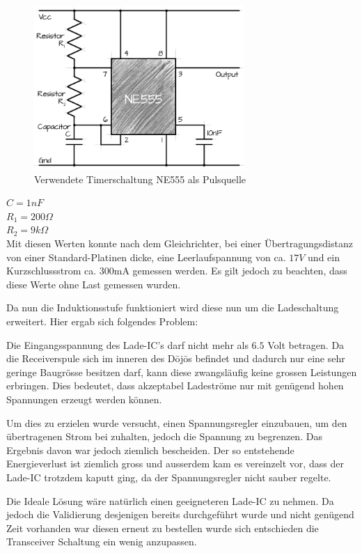 \begin{figure}[H]
	\begin{center}
		\includegraphics[width=80mm]{data/Ne555circuit.png}
		\caption[Verwendete Timerschaltung NE555 als Pulsquelle]{Verwendete Timerschaltung NE555 als Pulsquelle} %
		\label{fig:NE555}
	\end{center}
\end{figure}

$C = 1nF$\\
$R_{1} = 200\Omega$\\
$R_{2} = 9 k\Omega$\\

Mit diesen Werten konnte nach dem Gleichrichter, bei einer Übertragungsdistanz von einer Standard-Platinen dicke, eine Leerlaufspannung von ca. $17V$ und ein Kurzschlussstrom ca. 300mA gemessen werden. Es gilt jedoch zu beachten, dass diese Werte ohne Last gemessen wurden. 

Da nun die Induktionsstufe funktioniert wird diese nun um die Ladeschaltung erweitert. Hier ergab sich folgendes Problem:

Die Eingangsspannung des Lade-IC’s darf nicht mehr als $6.5$ Volt betragen. Da die Receiverspule sich im inneren des Dōjōs befindet und dadurch nur eine sehr geringe Baugrösse besitzen darf, kann diese zwangsläufig keine grossen Leistungen erbringen. Dies bedeutet, dass akzeptabel Ladeströme nur mit genügend hohen Spannungen erzeugt werden können.

Um dies zu erzielen wurde versucht, einen Spannungsregler einzubauen, um den übertragenen Strom bei zuhalten, jedoch die Spannung zu begrenzen. Das Ergebnis davon war jedoch ziemlich bescheiden. Der so entstehende Energieverlust ist ziemlich gross und ausserdem kam es vereinzelt vor, dass der Lade-IC trotzdem kaputt ging, da der Spannungsregler nicht sauber regelte. 

Die Ideale Lösung wäre natürlich einen geeigneteren Lade-IC zu nehmen. Da jedoch die Validierung desjenigen bereits durchgeführt wurde und nicht genügend Zeit vorhanden war diesen erneut zu bestellen wurde sich entschieden die Transceiver Schaltung ein wenig anzupassen.

